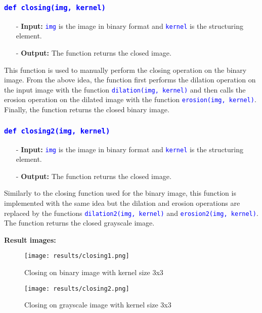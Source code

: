\documentclass{report}
\begin{document}
\subsubsection*{\textcolor{blue}{\lstinline|def closing(img, kernel)|}}

\begin{itemize}
  \item[-] \textbf{Input:} \textcolor{blue}{\lstinline|img|} is the image in binary format and \textcolor{blue}{\lstinline|kernel|} is the structuring element.
  \item[-] \textbf{Output:} The function returns the closed image.
\end{itemize}

This function is used to manually perform the closing operation on the binary image. From the above idea, the function first performs the dilation operation on the input image with the function \textcolor{blue}{\lstinline|dilation(img, kernel)|} and then calls the erosion operation on the dilated image with the function \textcolor{blue}{\lstinline|erosion(img, kernel)|}. Finally, the function returns the closed binary image.

\subsubsection*{\textcolor{blue}{\lstinline|def closing2(img, kernel)|}}

\begin{itemize}
  \item[-] \textbf{Input:} \textcolor{blue}{\lstinline|img|} is the image in binary format and \textcolor{blue}{\lstinline|kernel|} is the structuring element.
  \item[-] \textbf{Output:} The function returns the closed image.
\end{itemize}

Similarly to the closing function used for the binary image, this function is implemented with the same idea but the dilation and erosion operations are replaced by the functions \textcolor{blue}{\lstinline|dilation2(img, kernel)|} and \textcolor{blue}{\lstinline|erosion2(img, kernel)|}. The function returns the closed grayscale image.

\pagebreak
\textbf{Result images:}
\begin{figure}[H]
    \centering
    \texttt{[image: results/closing1.png]}
    \caption{Closing on binary image with kernel size 3x3}
    \bigskip
    \texttt{[image: results/closing2.png]}
    \caption{Closing on grayscale image with kernel size 3x3}
\end{figure}
\end{document}
